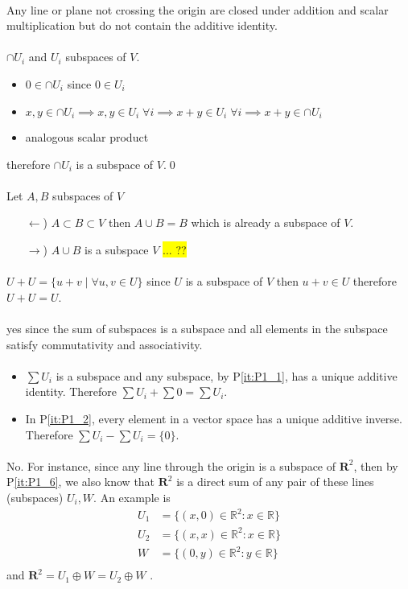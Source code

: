 \documentclass[11pt,notitlepage,oneside]{article}
\newcommand{\hilight}[1]{\colorbox{yellow}{#1}}
\newcommand{\pref}[1]{P\ref{#1}}
\newcommand{\exo}[1]{%
\addtocontents{toc}{\protect\setcounter{tocdepth}{2}}%
\paragraph{#1}}
\begin{document}
\exo{}
Any line or plane not crossing the origin are closed under addition and scalar multiplication but do not contain the additive identity.

\exo{}$\cap U_i$ and $U_i$ subspaces of $V$. 
\begin{itemize}
\item $0 \in \cap U_i$ since $0\in U_i$
 \item $x,y \in \cap U_i \implies x,y \in U_i\; \forall i \implies x+y \in U_i\; \forall i \implies x+y\in \cap U_i$
  \item analogous scalar product
\end{itemize}
therefore $\cap U_i$ is a subspace of $V$.\qed

\exo{} Let $A,B$ subspaces of $V$
\begin{itemize}
\item[$\leftarrow$)]$A\subset B \subset V$ then $A\cup B = B$ which is already a subspace of $V$.
\item[$\rightarrow$)] $A\cup B$ is a subspace $V$ \hilight{... ??}
\end{itemize}

\exo{}$U+U =\{ u+v \mid \forall u,v \in U\}$ since $U$ is a subspace of $V$ then $u+v\in U$ therefore $U+U=U$.

\exo{} yes since the sum of subspaces is a subspace and all elements in the subspace satisfy commutativity and associativity. 
\exo{} \begin{itemize}
\item $\sum U_i$ is a subspace and any subspace, by \pref{it:P1_1}, has a unique additive identity. Therefore $\sum U_i + \sum 0 = \sum U_i$.
\item In \pref{it:P1_2}, every element in a vector space has  a unique additive inverse. Therefore $\sum U_i - \sum U_i = \{0\}$.
\end{itemize}
\exo{} No. For instance, since any line through the origin is a subspace of $\mathbf{R}^2$, then by \pref{it:P1_6}, we also know 
that $\mathbf{R}^2$ is a direct sum of any pair of these lines (subspaces) $U_i, W$. 
An example is
\begin{align*}
  U_1 &= \{(x,0) \in \mathbb{R}^2 :x \in \mathbb{R} \}  \\
  U_2 &= \{(x,x)\in \mathbb{R}^2 :x \in \mathbb{R}  \}  \\
  W   &= \{(0,y)\in \mathbb{R}^2 :y \in \mathbb{R}  \}  \\
\end{align*}
and $\mathbf{R}^2 = U_1 \oplus W = U_2 \oplus W $ .
\end{document}
